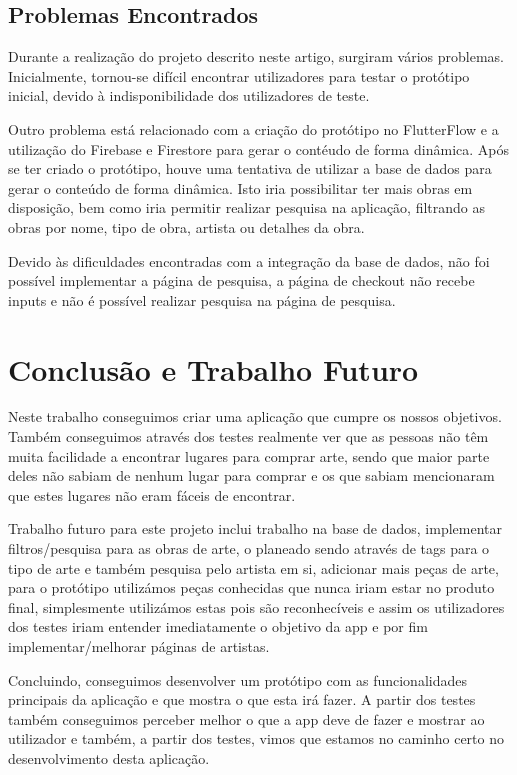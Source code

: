 \documentclass[conference]{IEEEtran}
\begin{document}
\subsection{Problemas Encontrados}

Durante a realização do projeto descrito neste artigo, surgiram vários problemas. Inicialmente, tornou-se difícil 
encontrar utilizadores para testar o protótipo inicial, devido à indisponibilidade dos utilizadores de teste. 

Outro problema está relacionado com a criação do protótipo no FlutterFlow 
e a utilização do Firebase e Firestore para gerar o contéudo de forma dinâmica. 
Após se ter criado o protótipo, houve uma tentativa de utilizar a base de dados para 
gerar o conteúdo de forma dinâmica. Isto iria possibilitar ter mais obras em disposição, 
bem como iria permitir realizar pesquisa na aplicação, filtrando as obras por nome, 
tipo de obra, artista ou detalhes da obra.

Devido às dificuldades encontradas com a integração da base de dados, 
não foi possível implementar a página de pesquisa, a página de checkout não 
recebe inputs e não é possível realizar pesquisa na página de pesquisa.


\section{Conclusão e Trabalho Futuro}

Neste trabalho conseguimos criar uma aplicação que cumpre os nossos objetivos. Também conseguimos através dos testes realmente ver que as pessoas não têm muita facilidade a encontrar lugares para comprar arte, sendo que maior parte deles não sabiam de nenhum lugar para comprar e os que sabiam mencionaram que estes lugares não eram fáceis de encontrar.

Trabalho futuro para este projeto inclui trabalho na base de dados, implementar filtros/pesquisa para as obras de arte, o planeado sendo através de tags para o tipo de arte e também pesquisa pelo artista em si, adicionar mais peças de arte, para o protótipo utilizámos peças conhecidas que nunca iriam estar no produto final, simplesmente utilizámos estas pois são reconhecíveis e assim os utilizadores dos testes iriam entender imediatamente o objetivo da app e por fim implementar/melhorar páginas de artistas.

Concluindo, conseguimos desenvolver um protótipo com as funcionalidades principais da aplicação e que mostra o que esta irá fazer. A partir dos testes também conseguimos perceber melhor o que a app deve de fazer e mostrar ao utilizador e também, a partir dos testes, vimos que estamos no caminho certo no desenvolvimento desta aplicação.



\end{document}
